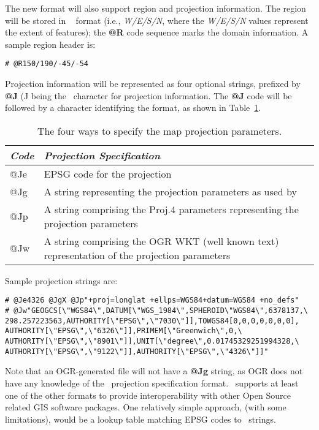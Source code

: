 The new format will also support region and projection information. The
region will be stored in \GMT\  format (i.e., \emph{W/E/S/N},
where the \emph{W/E/S/N} values represent the extent of features); the
\textbf{@R} code sequence marks the domain information.
A sample region header is:

\begin{verbatim}
# @R150/190/-45/-54
\end{verbatim}

Projection information will be represented as four optional strings,
prefixed by \textbf{@J} (J being the \GMT\ character for projection information.
The \textbf{@J} code will be followed by a character identifying the format, as shown
in Table~\ref{tbl:projectspec}.

\begin{table}[H]
\small
\centering
\begin{tabular}{|l|l|}  \hline
\emph{Code}	&	\emph{Projection Specification} \\ \hline \hline
@Je	&	EPSG code for the projection \\ \hline
@Jg	&	A string representing the projection parameters as used by \GMT\ \\ \hline
@Jp	&	A string comprising the Proj.4 parameters representing the projection parameters \\ \hline
@Jw	&	A string comprising the OGR WKT (well known text) representation of the projection parameters \\ \hline
\end{tabular}
\label{tbl:projectspec}
\caption{The four ways to specify the map projection parameters.}
\end{table} 

Sample projection strings are:

\begin{verbatim}
# @Je4326 @JgX @Jp"+proj=longlat +ellps=WGS84+datum=WGS84 +no_defs"
# @Jw"GEOGCS[\"WGS84\",DATUM[\"WGS_1984\",SPHEROID\"WGS84\",6378137,\
298.257223563,AUTHORITY[\"EPSG\",\"7030\"]],TOWGS84[0,0,0,0,0,0,0],
AUTHORITY[\"EPSG\",\"6326\"]],PRIMEM[\"Greenwich\",0,\
AUTHORITY[\"EPSG\",\"8901\"]],UNIT[\"degree\",0.01745329251994328,\
AUTHORITY[\"EPSG\",\"9122\"]],AUTHORITY[\"EPSG\",\"4326\"]]"
\end{verbatim}

Note that an OGR-generated file will not have a \textbf{@Jg} string, as OGR does
not have any knowledge of the \GMT\ projection specification format. 
\GMT\ supports at least one of the other formats to provide interoperability with other Open Source
related GIS software packages. One relatively simple approach, (with
some limitations), would be a lookup table matching EPSG codes to \GMT\ strings. 

